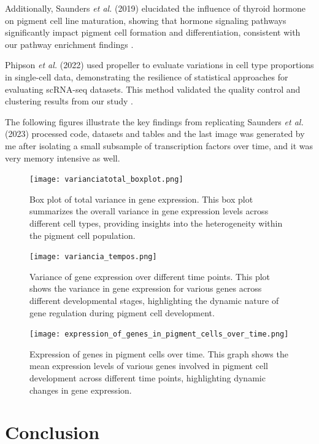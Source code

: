 \documentclass[runningheads]{llncs}
\begin{document}
Additionally, Saunders \textit{et al.} (2019) elucidated the influence of thyroid hormone on pigment cell line maturation, showing that hormone signaling pathways significantly impact pigment cell formation and differentiation, consistent with our pathway enrichment findings \cite{saunders2019thyroid}.

Phipson \textit{et al.} (2022) used propeller to evaluate variations in cell type proportions in single-cell data, demonstrating the resilience of statistical approaches for evaluating scRNA-seq datasets. This method validated the quality control and clustering results from our study \cite{phipson2022propeller}.

The following figures illustrate the key findings from replicating Saunders \textit{et al.} (2023) processed code, datasets and tables and the last image was generated by me after isolating a small subsample of transcription factors over time, and it was very memory intensive as well.

\begin{figure}[H]
\centering
\texttt{[image: varianciatotal\_boxplot.png]}
\caption{Box plot of total variance in gene expression. This box plot summarizes the overall variance in gene expression levels across different cell types, providing insights into the heterogeneity within the pigment cell population.}
\label{results 1}
\end{figure}

\begin{figure}[H]
\centering
\texttt{[image: variancia\_tempos.png]}
\caption{Variance of gene expression over different time points. This plot shows the variance in gene expression for various genes across different developmental stages, highlighting the dynamic nature of gene regulation during pigment cell development.}
\label{results 2}
\end{figure}

\begin{figure}[H]
\centering
\texttt{[image: expression\_of\_genes\_in\_pigment\_cells\_over\_time.png]}
\caption{Expression of genes in pigment cells over time. This graph shows the mean expression levels of various genes involved in pigment cell development across different time points, highlighting dynamic changes in gene expression.}
\label{results 3}
\end{figure}

\section{Conclusion}
\end{document}
